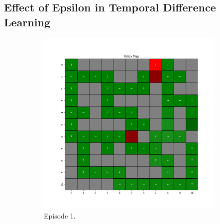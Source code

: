 \documentclass{assignment}
\begin{document}
\subsection{Effect of Epsilon in Temporal Difference Learning}



\begin{figure}[H]
    \begin{subfigure}{0.3\textwidth}
        \includegraphics[width=\textwidth]{figures/policy_td/epsilon_sweep/policy_alpha_0.1_gamma_0.95_epsilon_0.0_iteration_1.png}
    \caption{Episode 1.}
    \end{subfigure}\hfill
    \begin{subfigure}{0.3\textwidth}

\end{subfigure}
\end{figure}
\end{document}
